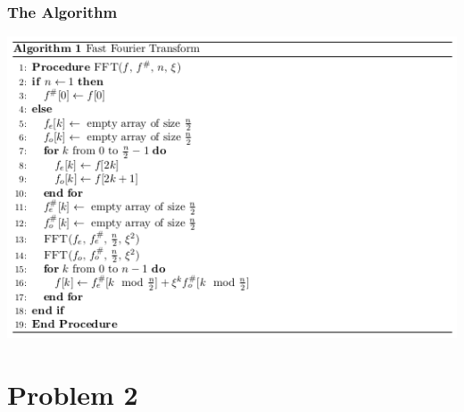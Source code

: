 \documentclass{beamer}
\begin{document}
\begin{frame}
	\frametitle{The Algorithm}
	\includegraphics[scale=0.6]{fft_algorithm.png}
\end{frame}

\section{Problem 2}
\end{document}
